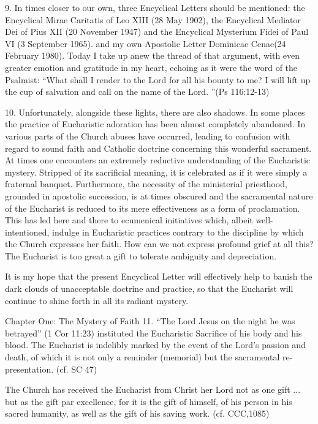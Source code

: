 \documentclass[oneside]{book}
\begin{document}
9. In times closer to our own, three Encyclical Letters should be mentioned: the
Encyclical Mirae Caritatis of Leo XIII (28 May 1902), the Encyclical Mediator
Dei of Pius XII (20 November 1947) and the Encyclical Mysterium Fidei of Paul VI
(3 September 1965). and my own Apostolic Letter Dominicae Cenae(24 February
1980). Today I take up anew the thread of that argument, with even greater
emotion and gratitude in my heart, echoing as it were the word of the Psalmist:
``What shall I render to the Lord for all his bounty to me? I will lift up the
cup of salvation and call on the name of the Lord. ''(Ps 116:12-13)

10. Unfortunately, alongside these lights, there are also shadows. In some
places the practice of Eucharistic adoration has been almost completely
abandoned. In various parts of the Church abuses have occurred, leading to
confusion with regard to sound faith and Catholic doctrine concerning this
wonderful sacrament. At times one encounters an extremely reductive
understanding of the Eucharistic mystery. Stripped of its sacrificial meaning,
it is celebrated as if it were simply a fraternal banquet. Furthermore, the
necessity of the ministerial priesthood, grounded in apostolic succession, is at
times obscured and the sacramental nature of the Eucharist is reduced to its
mere effectiveness as a form of proclamation. This has led here and there to
ecumenical initiatives which, albeit well-intentioned, indulge in Eucharistic
practices contrary to the discipline by which the Church expresses her
faith. How can we not express profound grief at all this? The Eucharist is too
great a gift to tolerate ambiguity and depreciation.

It is my hope that the present Encyclical Letter will effectively help to banish
the dark clouds of unacceptable doctrine and practice, so that the Eucharist
will continue to shine forth in all its radiant mystery.

Chapter One: The Mystery of Faith
11. ``The Lord Jesus on the night he was betrayed'' (1 Cor 11:23) instituted the
Eucharistic Sacrifice of his body and his blood. The Eucharist is indelibly
marked by the event of the Lord's passion and death, of which it is not only a
reminder (memorial) but the sacramental re-presentation. (cf. SC 47)

The Church has received the Eucharist from Christ her Lord not as one gift
... but as the gift par excellence, for it is the gift of himself, of his person
in his sacred humanity, as well as the gift of his saving work. (cf. CCC,1085)
\end{document}
